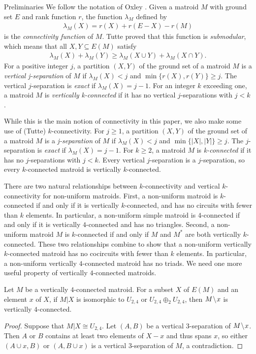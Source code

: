 \documentclass[12pt]{amsart}
\begin{document}
\begin{section}{Preliminaries} \label{preliminaries}
We follow the notation of Oxley \cite{Oxley}.
Given a matroid $M$ with ground set $E$ and rank function $r$, the function $\lambda_M$ defined by 
\begin{align*}
\lambda_M(X) = r(X) + r(E - X) - r(M)
\end{align*}
is the \emph{connectivity function} of $M$.
Tutte \cite{Tutte} proved that this function is \emph{submodular}, which means that all $X, Y \subseteq E(M)$ satisfy
\begin{align*}
\lambda_M(X) + \lambda_M(Y) \ge \lambda_M(X \cup Y) + \lambda_M(X \cap Y).
\end{align*}
For a positive integer $j$, a partition $(X,Y)$ of the ground set of a matroid $M$ is a \emph{vertical j-separation} of $M$ if $\lambda_M(X) < j$ and $\min\{r(X), r(Y)\} \ge j$.
The vertical $j$-separation is \emph{exact} if $\lambda_M(X) = j - 1$.
For an integer $k$ exceeding one, a matroid $M$ is \emph{vertically k-connected} if it has no vertical $j$-separations with $j < k$.

While this is the main notion of connectivity in this paper, we also make some use of (Tutte) $k$-connectivity.
For $j \ge 1$, a partition $(X,Y)$ of the ground set of a matroid $M$ is a \emph{j-separation} of $M$ if $\lambda_M(X) < j$ and $\min\{|X|, |Y|\} \ge j$.
The $j$-separation is \emph{exact} if $\lambda_M(X) = j - 1$.
For $k \ge 2$, a matroid $M$ is \emph{k-connected} if it has no $j$-separations with $j < k$.
Every vertical $j$-separation is a $j$-separation, so every $k$-connected matroid is vertically $k$-connected.

There are two natural relationships between $k$-connectivity and vertical $k$-connectivity for non-uniform matroids.
First, a non-uniform matroid is $k$-connected if and only if it is vertically $k$-connected, and has no circuits with fewer than $k$ elements.
In particular, a non-uniform simple matroid is $4$-connected if and only if it is vertically $4$-connected and has no triangles.
Second, a non-uniform matroid $M$ is $k$-connected if and only if $M$ and $M^*$ are both vertically $k$-connected.
These two relationships combine to show that a non-uniform vertically $k$-connected matroid has no cocircuits with fewer than $k$ elements.
In particular, a non-uniform vertically $4$-connected matroid has no triads.
We need one more useful property of vertically $4$-connected matroids.

\begin{lemma} \label{4-pt line}
Let $M$ be a vertically $4$-connected matroid. 
For a subset $X$ of $E(M)$ and an element $x$ of $X$, if $M|X$ is isomorphic to $U_{2,4}$ or $U_{2,4} \oplus_2 U_{2,4}$, then $M \!\setminus\! x$ is vertically $4$-connected.
\end{lemma}
\begin{proof}
Suppose that $M|X \cong U_{2,4}$.
Let $(A,B)$ be a vertical $3$-separation of $M \!\setminus\! x$.
Then $A$ or $B$ contains at least two elements of $X - x$ and thus spans $x$, so either $(A \cup x, B)$ or $(A, B \cup x)$ is a vertical $3$-separation of $M$, a contradiction.


\end{proof}
\end{section}
\end{document}
